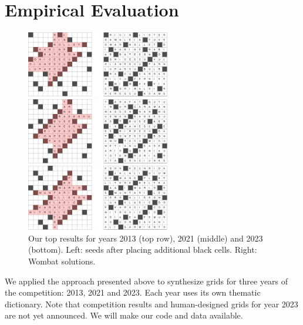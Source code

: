 \section{Empirical Evaluation}


\begin{figure}[th]
\centering
\includegraphics[width=0.56\textwidth]{_empiricalSupport/y-2013/results/_runWombat/mrmeGrids_y2013-60x932-14400x352-14113466-paper.pdf}

\vspace{0.15cm}

\includegraphics[width=0.56\textwidth]{_empiricalSupport/y-2021/results/_runWombat/mrmeGrids_feb3-60x38035-14400x224-13741779-paper.pdf}

\vspace{0.15cm}

\includegraphics[width=0.56\textwidth]{_empiricalSupport/y-2023/results/_runWombat/mrmeGrids_y2023-60x446-14400x352-14179462-paper.pdf}

\caption{Our top results for years 2013 (top row), 2021 (middle) and 2023 (bottom). Left: seeds after
placing additional black cells. Right: {\sc Wombat} solutions.}
\label{fig:results}
\end{figure}

We applied the approach presented above to synthesize grids for three years of the competition: 2013, 2021 and 2023. Each year uses its own thematic dictionary. Note that competition results and human-designed grids for year 2023 are not yet announced.
We will make our code and data available.



